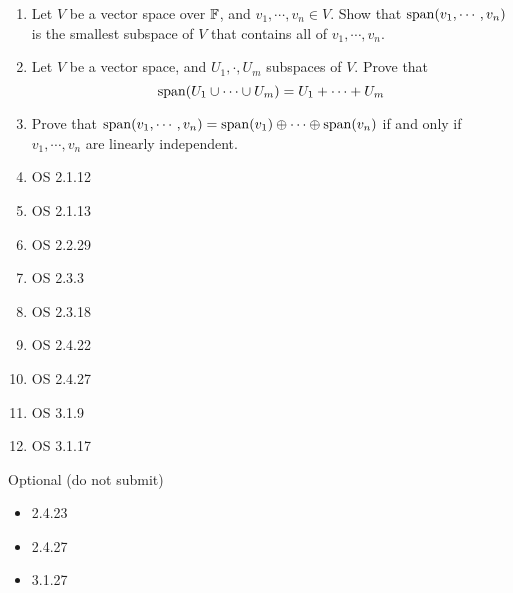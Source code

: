 \documentclass{amsart}
\begin{document}
	\begin{enumerate}
		\item Let $V$ be a vector space over $\mathbb{F}$, and $v_1,\cdots,v_n\in V$. Show that $\operatorname{span} (v_1,\cdots,v_n)$ is the  smallest subspace of $V$ that contains all of $v_1,\cdots,v_n$.
		\item Let $V$ be a vector space, and $U_1,\cdot,U_m$ subspaces of $V$. Prove that
		\[\operatorname{span}(U_1\cup \cdots \cup U_m) = U_1+\cdots+U_m\]
		\item Prove that $\operatorname{span}(v_1,\cdots,v_n) = \operatorname{span}(v_1)\oplus \cdots \oplus \operatorname{span}(v_n)$ if and only if $v_1,\cdots,v_n$ are linearly independent. 
		\item OS 2.1.12
		\item OS 2.1.13
		\item OS 2.2.29
		\item OS 2.3.3
		\item OS 2.3.18
		\item OS 2.4.22
		\item OS 2.4.27
		\item OS 3.1.9
		\item OS 3.1.17
	
	 	\end{enumerate}
	 	Optional (do not submit)
	 	\begin{itemize}
	 		\item 2.4.23
	 		\item 2.4.27
	 		\item 3.1.27
	 	\end{itemize}
	
\end{document}
